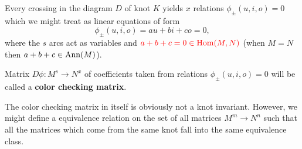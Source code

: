 Every crossing in the diagram $D$ of knot $K$ yields $x$ relations $\phi_\pm(u,i,o)=0$ which we might treat as linear equations of form 
$$\phi_\pm(u,i,o)=au+bi+co=0,$$
where the $s$ arcs act as variables and $\color{red}a+b+c=0\in \operatorname{Hom}(M, N)$ (when $M=N$ then $a+b+c\in\operatorname{Ann}(M)$).

\medskip

\begin{definition}
  Matrix $D\phi:M^s\to N^x$ of coefficients taken from relations $\phi_\pm(u,i,o)=0$ will be called a \textbf{color checking matrix}. 
\end{definition}

The color checking matrix in itself is obviously not a knot invariant. However, we might define a equivalence relation on the set of all matrices $M^m\to N^n$ such that all the matrices which come from the same knot fall into the same equivalence class.


